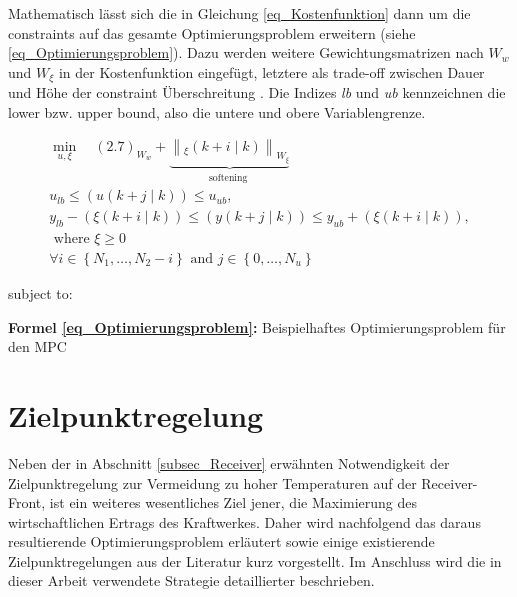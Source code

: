 Mathematisch lässt sich die in Gleichung \ref{eq_Kostenfunktion} dann um die constraints auf das gesamte Optimierungsproblem erweitern (siehe \ref{eq_Optimierungsproblem}).
Dazu werden weitere Gewichtungsmatrizen nach \cite[S. 4]{Schwenzer}$W_w$ und $W_\xi$ in der Kostenfunktion eingefügt, letztere als trade-off zwischen Dauer und Höhe der constraint Überschreitung \cite{Rawlings}.
Die Indizes \textit{lb} und \textit{ub} kennzeichnen die lower bzw. upper bound, also die untere und obere Variablengrenze.

\begin{equation} \label{eq_Optimierungsproblem}
\begin{gathered}
    \min_{u, \xi} \quad (2.7)_{W_w}+\underbrace{\left\|_{\xi}(k+i \mid k)\right\|_{W_{\xi}}}_{\text {softening }} \qquad\\
    u_{l b} \leq(u(k+j \mid k)) \leq u_{u b}, \\
    y_{l b}-(\xi(k+i \mid k)) \leq(y(k+j \mid k)) \leq y_{u b}+(\xi(k+i \mid k)), \\
    \text { where } \xi \geq 0 \\
    \forall i \in\left\{N_1, \ldots, N_2-i\right\} \text { and } j \in\left\{0, \ldots, N_u\right\}
\end{gathered}
\end{equation}

\vspace*{-5.2\baselineskip}
\qquad subject to:
\vspace*{4.2\baselineskip}
\centerline{\small{\textsf{\textbf{Formel \ref{eq_Optimierungsproblem}:}} Beispielhaftes Optimierungsproblem für den MPC}}


\section{Zielpunktregelung} \label{sec_Zielpunktregelung}
Neben der in Abschnitt \ref{subsec_Receiver} erwähnten Notwendigkeit der Zielpunktregelung zur Vermeidung zu hoher Temperaturen auf der Receiver-Front, ist ein weiteres wesentliches Ziel jener, die Maximierung des wirtschaftlichen Ertrags des Kraftwerkes.
Daher wird nachfolgend das daraus resultierende Optimierungsproblem erläutert sowie einige existierende Zielpunktregelungen aus der Literatur kurz vorgestellt.
Im Anschluss wird die in dieser Arbeit verwendete Strategie detaillierter beschrieben.

